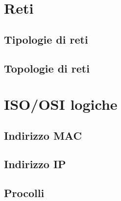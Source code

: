 \documentclass[11pt,fleqn]{book}
\begin{document}
\chapter{Reti}

\section{Tipologie di reti}

\section{Topologie di reti}



\chapter{ISO/OSI logiche}

\section{Indirizzo MAC}
\section{Indirizzo IP}
\section{Procolli}
\end{document}
